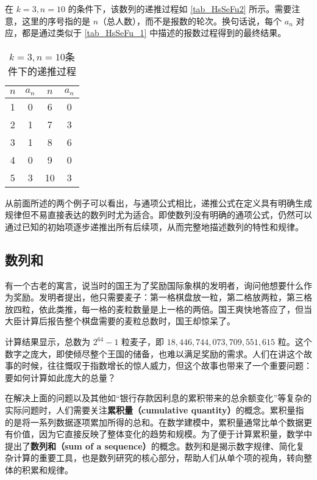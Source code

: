 在 $k=3, n=10$ 的条件下，该数列的递推过程如 \autoref{tab_HsSeFu2} 所示。需要注意，这里的序号指的是 $n$（总人数），而不是报数的轮次。换句话说，每个 $a_n$ 对应，都是通过类似于 \autoref{tab_HsSeFu_1} 中描述的报数过程得到的最终结果。

\begin{table}[ht]
\centering
\caption{$k=3,n=10$条件下的递推过程}\label{tab_HsSeFu2}
\begin{tabular}{|c|c|c|c|}
\hline
$n$ & $a_n$ & $n$ & $a_n$ \\
\hline
1 & 0 & 6 & 0 \\
\hline
2 & 1 & 7 & 3 \\
\hline
3 & 1 & 8 & 6 \\
\hline
4 & 0 & 9 & 0 \\
\hline
5 & 3 & 10 & 3 \\
\hline
\end{tabular}
\end{table}

从前面所述的两个例子可以看出，与通项公式相比，递推公式在定义具有明确生成规律但不易直接表达的数列时尤为适合。即使数列没有明确的通项公式，仍然可以通过已知的初始项逐步递推出所有后续项，从而完整地描述数列的特性和规律。

\subsection{数列和}

有一个古老的寓言，说当时的国王为了奖励国际象棋的发明者，询问他想要什么作为奖励。发明者提出，他只需要麦子：第一格棋盘放一粒，第二格放两粒，第三格放四粒，依此类推，每一格的麦粒数量是上一格的两倍。国王爽快地答应了，但当大臣计算后报告整个棋盘需要的麦粒总数时，国王却惊呆了。

计算结果显示，总数为 $2^{64} - 1$ 粒麦子，即 $18,446,744,073,709,551,615$ 粒。这个数字之庞大，即使倾尽整个王国的储备，也难以满足奖励的需求。人们在讲这个故事的时候，往往慨叹于指数增长的惊人威力，但这个故事也带来了一个重要问题：要如何计算如此庞大的总量？

在解决上面的问题以及其他如“银行存款因利息的累积带来的总余额变化”等复杂的实际问题时，人们需要关注\textbf{累积量（cumulative quantity）}的概念。累积量指的是将一系列数据逐项累加所得的总和。在数学建模中，累积量通常比单个数据更有价值，因为它直接反映了整体变化的趋势和规模。为了便于计算累积量，数学中提出了\textbf{数列和（sum of a sequence）}的概念。数列和是揭示数字规律、简化复杂计算的重要工具，也是数列研究的核心部分，帮助人们从单个项的视角，转向整体的积累和规律。

